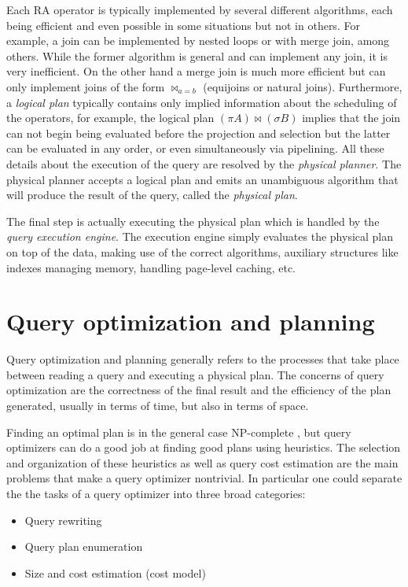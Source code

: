 Each RA operator is typically implemented by several different
algorithms, each being efficient and even possible in some situations
but not in others. For example, a join can be implemented by nested
loops or with merge join, among others.  While the former algorithm is
general and can implement any join, it is very inefficient. On the
other hand a merge join is much more efficient but can only implement
joins of the form \(\Join_{a=b}\) (equijoins or natural
joins). Furthermore, a \emph{logical plan} typically contains only
implied information about the scheduling of the operators, for
example, the logical plan \((\pi A) \Join (\sigma B)\) implies that
the join can not begin being evaluated before the projection and
selection but the latter can be evaluated in any order, or even
simultaneously via pipelining. All these details about the execution
of the query are resolved by the \emph{physical planner}. The physical
planner accepts a logical plan and emits an unambiguous algorithm that
will produce the result of the query, called the \emph{physical plan}.


The final step is actually executing the physical plan which is
handled by the \emph{query execution engine}. The execution engine
simply evaluates the physical plan on top of the data, making use of
the correct algorithms, auxiliary structures like indexes managing
memory, handling page-level caching, etc.

\section{Query optimization and planning}

Query optimization and planning generally refers to the processes that
take place between reading a query and executing a physical plan. The
concerns of query optimization are the correctness of the final result and
the efficiency of the plan generated, usually in terms of time, but
also in terms of space.

Finding an optimal plan is in the general case NP-complete
\cite{ullmanInformationIntegrationUsing1997}, but query optimizers can
do a good job at finding good plans using heuristics. The selection
and organization of these heuristics as well as query cost estimation
are the main problems that make a query optimizer nontrivial. In
particular one could separate the the tasks of a query optimizer
into three broad categories:

\begin{itemize}
\item Query rewriting
\item Query plan enumeration
\item Size and cost estimation (cost model)
\end{itemize}


